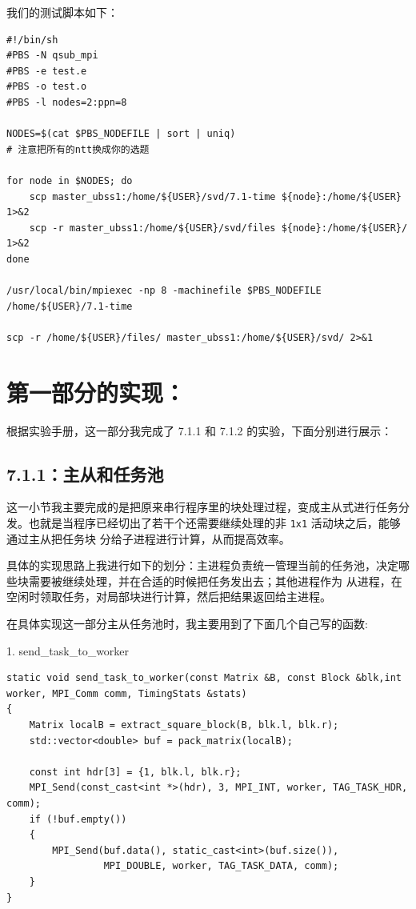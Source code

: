 \documentclass[12pt,a4paper,fontset=none]{ctexart}
\begin{document}
我们的测试脚本如下：
\begin{lstlisting}
#!/bin/sh
#PBS -N qsub_mpi
#PBS -e test.e
#PBS -o test.o
#PBS -l nodes=2:ppn=8

NODES=$(cat $PBS_NODEFILE | sort | uniq)
# 注意把所有的ntt换成你的选题

for node in $NODES; do
    scp master_ubss1:/home/${USER}/svd/7.1-time ${node}:/home/${USER} 1>&2
    scp -r master_ubss1:/home/${USER}/svd/files ${node}:/home/${USER}/ 1>&2
done

/usr/local/bin/mpiexec -np 8 -machinefile $PBS_NODEFILE /home/${USER}/7.1-time

scp -r /home/${USER}/files/ master_ubss1:/home/${USER}/svd/ 2>&1
\end{lstlisting}

\section{第一部分的实现：}

根据实验手册，这一部分我完成了 7.1.1 和 7.1.2 的实验，下面分别进行展示：

\subsection{7.1.1：主从和任务池}

这一小节我主要完成的是把原来串行程序里的块处理过程，变成主从式进行任务分发。也就是当程序已经切出了若干个还需要继续处理的非 \texttt{1x1} 活动块之后，能够通过主从把任务块
分给子进程进行计算，从而提高效率。

具体的实现思路上我进行如下的划分：主进程负责统一管理当前的任务池，决定哪些块需要被继续处理，并在合适的时候把任务发出去；其他进程作为
从进程，在空闲时领取任务，对局部块进行计算，然后把结果返回给主进程。

在具体实现这一部分主从任务池时，我主要用到了下面几个自己写的函数:

1. send\_task\_to\_worker
\begin{lstlisting}
static void send_task_to_worker(const Matrix &B, const Block &blk,int worker, MPI_Comm comm, TimingStats &stats)
{
    Matrix localB = extract_square_block(B, blk.l, blk.r);
    std::vector<double> buf = pack_matrix(localB);

    const int hdr[3] = {1, blk.l, blk.r};
    MPI_Send(const_cast<int *>(hdr), 3, MPI_INT, worker, TAG_TASK_HDR, comm);
    if (!buf.empty())
    {
        MPI_Send(buf.data(), static_cast<int>(buf.size()),
                 MPI_DOUBLE, worker, TAG_TASK_DATA, comm);
    }
}
\end{lstlisting}
\end{document}
